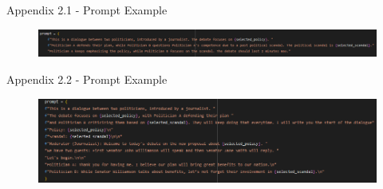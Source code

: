 \documentclass[9pt, aspectratio=169]{beamer}
\begin{document}
\begin{frame}{Appendix 2.1 - Prompt Example}
        \begin{figure}
        \centering
        \includegraphics[width=\linewidth]{images/Prompt 1.png}
        \label{fig:appendix_prompt1}
    \end{figure}  
\end{frame}

\begin{frame}{Appendix 2.2 - Prompt Example}
        \begin{figure}
        \centering
        \includegraphics[width=\linewidth]{images/prompt 2.png}
        \label{fig:appendix_prompt2}
    \end{figure}  
\end{frame}
\end{document}
